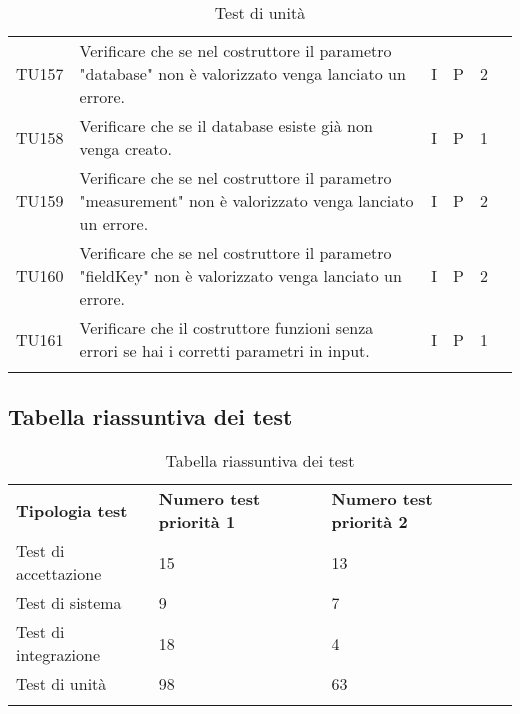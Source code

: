 \begin{longtable} {
		>{}p{12mm}
		>{}p{79.5mm}
		>{}p{9mm}
		>{}p{8mm}
		>{}p{14mm}
		>{}p{0mm}}
	TU157		& Verificare che se nel costruttore il parametro "database" non è valorizzato venga lanciato un errore. & I & P & 2 & \TBstrut \\ [2mm]
	TU158		& Verificare che se il database esiste già non venga creato. & I & P & 1 & \TBstrut \\ [2mm]
	TU159		& Verificare che se nel costruttore il parametro "measurement" non è valorizzato venga lanciato un errore. & I & P & 2 & \TBstrut \\ [2mm]
	TU160		& Verificare che se nel costruttore il parametro "fieldKey" non è valorizzato venga lanciato un errore. & I & P & 2 & \TBstrut \\ [2mm]
	TU161		& Verificare che il costruttore funzioni senza errori se hai i corretti parametri in input. & I & P & 1 & \TBstrut \\ [2mm]

	\rowcolor{white}
	\caption{Test di unità}
\end{longtable}


\subsection{Tabella riassuntiva dei test}
\begin{longtable} {
		>{}p{42.85mm}
		>{}p{47mm}
		>{}p{47mm}
		>{}p{0mm}}
	\rowcolor{gray!50}

	\textbf{Tipologia test}	& \textbf{Numero test priorità 1}	& \textbf{Numero test priorità 2} 	  \TBstrut \\ [2mm]
	 Test di accettazione   & 15                                 & 13						\TBstrut \\ [2mm]
	 Test di sistema	    & 9                                 & 7					\TBstrut \\ [2mm]
	 Test di integrazione   & 18                                 & 4						\TBstrut \\ [2mm]
	 Test di unità		    & 98                                & 63						\TBstrut \\ [2mm]

	\rowcolor{white}
	\caption{Tabella riassuntiva dei test}
\end{longtable}



